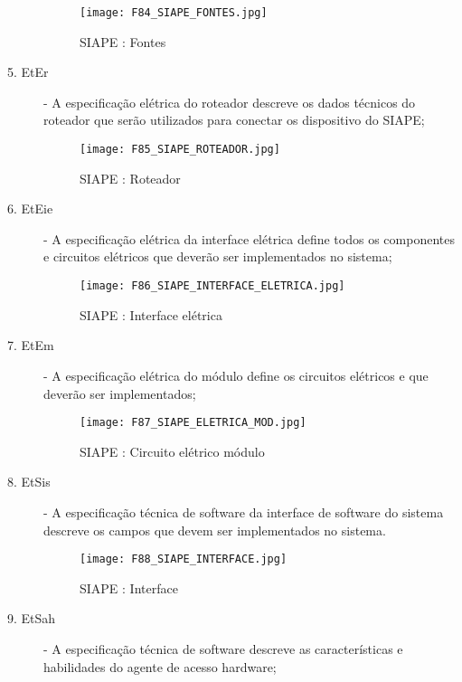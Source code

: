 \begin{description}
			 \begin{figure}[!h]
			 	\centering
			 	\texttt{[image: F84\_SIAPE\_FONTES.jpg]} 
			 	\caption{SIAPE : Fontes}
			 	\label{F84}
			 \end{figure}
		
		\item[5. EtEr] - A especificação elétrica do roteador descreve os dados técnicos do roteador que serão utilizados para conectar os dispositivo do SIAPE;
		
		
			 \begin{figure}[!h]
			 	\centering
			 	\texttt{[image: F85\_SIAPE\_ROTEADOR.jpg]} 
			 	\caption{SIAPE : Roteador}
			 	\label{F85}
			 \end{figure}
		
		\item[6. EtEie] -  A especificação elétrica da interface elétrica define todos os componentes e circuitos elétricos que deverão ser implementados no sistema;
		
		
		 \begin{figure}[!h]
		 	\centering
		 	\texttt{[image: F86\_SIAPE\_INTERFACE\_ELETRICA.jpg]} 
		 	\caption{SIAPE : Interface elétrica}
		 	\label{F86}
		 \end{figure}
		
		\item[7. EtEm] - A especificação elétrica do módulo define os circuitos elétricos e que deverão ser implementados;
		
		 \begin{figure}[!h]
		 	\centering
		 	\texttt{[image: F87\_SIAPE\_ELETRICA\_MOD.jpg]} 
		 	\caption{SIAPE : Circuito elétrico módulo }
		 	\label{F87}
		 \end{figure}
		
		
		\item[8. EtSis] - A especificação técnica de software da interface de software do sistema descreve os campos que devem ser implementados no sistema.

		 \begin{figure}[!h]
		 	\centering
		 	\texttt{[image: F88\_SIAPE\_INTERFACE.jpg]} 
		 	\caption{SIAPE : Interface}
		    \label{F88}
		 \end{figure}

		\item[9. EtSah] - A especificação técnica de software descreve as características e habilidades do agente de acesso hardware;
			

\end{description}
